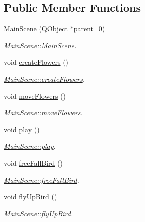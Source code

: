 \subsection*{Public Member Functions}
\begin{DoxyCompactItemize}
\item 
\hyperlink{class_main_scene_a539e1c90b1c7f2e910d44cfd8ec45e1c}{Main\+Scene} (Q\+Object $\ast$parent=0)
\begin{DoxyCompactList}\small\item\em \hyperlink{class_main_scene_a539e1c90b1c7f2e910d44cfd8ec45e1c}{Main\+Scene\+::\+Main\+Scene}. \end{DoxyCompactList}\item 
void \hyperlink{class_main_scene_a204ffd620222634956a901d7cbc39a14}{create\+Flowers} ()
\begin{DoxyCompactList}\small\item\em \hyperlink{class_main_scene_a204ffd620222634956a901d7cbc39a14}{Main\+Scene\+::create\+Flowers}. \end{DoxyCompactList}\item 
void \hyperlink{class_main_scene_a34c634cb6edca409b8818b90a6c8f6a3}{move\+Flowers} ()
\begin{DoxyCompactList}\small\item\em \hyperlink{class_main_scene_a34c634cb6edca409b8818b90a6c8f6a3}{Main\+Scene\+::move\+Flowers}. \end{DoxyCompactList}\item 
void \hyperlink{class_main_scene_a9686cf85301e0adf9fdf6fcfac8e1d54}{play} ()
\begin{DoxyCompactList}\small\item\em \hyperlink{class_main_scene_a9686cf85301e0adf9fdf6fcfac8e1d54}{Main\+Scene\+::play}. \end{DoxyCompactList}\item 
void \hyperlink{class_main_scene_a2da7b3de66fab703d85ab25aa899f12b}{free\+Fall\+Bird} ()
\begin{DoxyCompactList}\small\item\em \hyperlink{class_main_scene_a2da7b3de66fab703d85ab25aa899f12b}{Main\+Scene\+::free\+Fall\+Bird}. \end{DoxyCompactList}\item 
void \hyperlink{class_main_scene_a61958a11669a25126ac32ac70a758c11}{fly\+Up\+Bird} ()
\begin{DoxyCompactList}\small\item\em \hyperlink{class_main_scene_a61958a11669a25126ac32ac70a758c11}{Main\+Scene\+::fly\+Up\+Bird}. \end{DoxyCompactList}\item 

\end{DoxyCompactItemize}
